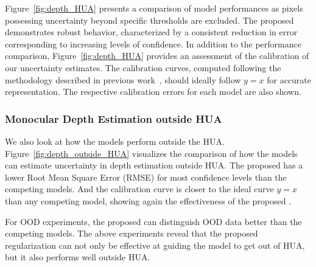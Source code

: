 

Figure~\ref{fig:depth_HUA} presents a comparison of model performances as pixels possessing uncertainty beyond specific thresholds are excluded. The proposed \ours demonstrates robust behavior, characterized by a consistent reduction in error corresponding to increasing levels of confidence. In addition to the performance comparison, Figure~\ref{fig:depth_HUA} provides an assessment of the calibration of our uncertainty estimates. The calibration curves, computed following the methodology described in previous work~\cite{kuleshov2018accurate}, should ideally follow $y=x$ for accurate representation. The respective calibration errors for each model are also shown. 



\subsubsection{Monocular Depth Estimation outside HUA}
We also look at how the models perform outside the HUA. Figure~\ref{fig:depth_outside_HUA} visualizes the comparison of how the models can estimate uncertainty in depth estimation outside HUA. The proposed \ours has a lower Root Mean Square Error (RMSE) for most confidence levels than the competing models. And the calibration curve is closer to the ideal curve $y=x$ than any competing model, showing again the effectiveness of the proposed \ours.

For OOD experiments, the proposed \ours can distinguish OOD data better than the competing models. The above experiments reveal that the proposed regularization can not only be effective at guiding the model to get out of HUA, but it also performs well outside HUA. 


